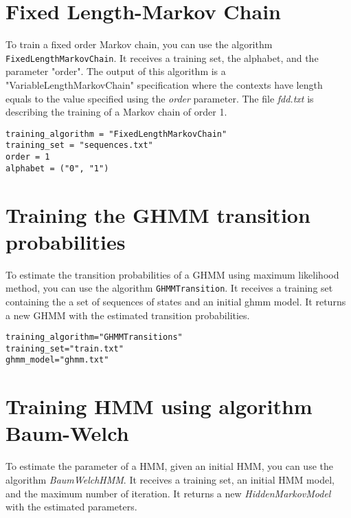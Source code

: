 \section{Fixed Length-Markov Chain}

To train a fixed order Markov chain, you can use the algorithm \texttt{FixedLengthMarkovChain}. It receives a training set, the alphabet, and the parameter "order". The output of this algorithm is a "VariableLengthMarkovChain" specification where the contexts have length equals to the value specified using the \textit{order} parameter. The file  \textit{fdd.txt} is describing the training of a Markov chain of order 1.
 
\vspace{1em}
\begin{minipage}{\textwidth}
\begin{Verbatim}[frame=single,  label={fdd.txt}]
training_algorithm = "FixedLengthMarkovChain"
training_set = "sequences.txt"
order = 1
alphabet = ("0", "1")
\end{Verbatim}
\end{minipage}
\vspace{1em}

\section{Training the GHMM transition probabilities}

To estimate the transition probabilities of a GHMM using maximum likelihood method, you can use the algorithm \texttt{GHMMTransition}. It receives a training set containing the a set of sequences of states and an initial ghmm model. It returns a new GHMM with the estimated transition probabilities.

\begin{Verbatim}[frame=single, label=train\_transitions.txt]
training_algorithm="GHMMTransitions"
training_set="train.txt"
ghmm_model="ghmm.txt"
\end{Verbatim}


\section{Training HMM using algorithm Baum-Welch}

To estimate the parameter of a HMM, given an initial HMM, you can use the algorithm \textit{BaumWelchHMM}. It receives a training set, an initial HMM model, and the maximum number of iteration. It returns a new \textit{HiddenMarkovModel} with the estimated parameters.

